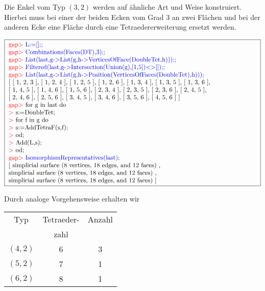 \documentclass[12pt,titlepage,twoside,cleardoublepage]{article}
\theoremstyle{nummermitklammern}
\numberwithin{equation}{section}
\begin{document}
 Die Enkel vom Typ $(3,2)$ werden auf ähnliche Art und Weise konstruiert. Hierbei muss bei einer der beiden Ecken vom Grad 3 an zwei Flächen und bei der anderen Ecke eine Fläche durch eine Tetraedererweiterung ersetzt werden.
 \begin{center}
 $\fbox{
\parbox{14cm}{
\textcolor{red}{gap$>$} \textcolor{blue}{L:=[];;}\newline
\textcolor{red}{gap$>$} \textcolor{blue}{Combinations(Faces(DT),3);;}\newline
\textcolor{red}{gap$>$} \textcolor{blue}{List(last,g-$>$List(g,h-$>$VerticesOfFace(DoubleTet,h)));;}\newline
\textcolor{red}{gap$>$} \textcolor{blue}{Filtered(last,g-$>$Intersection(Union(g),[1,5])<>[]);;}\newline
\textcolor{red}{gap$>$} \textcolor{blue}{List(last,g-$>$List(g,h->Position(VerticesOfFaces(DoubleTet),h)));}\newline
[ [ 1, 2, 3 ], [ 1, 2, 4 ], [ 1, 2, 5 ], [ 1, 2, 6 ], [ 1, 3, 4 ],
  [ 1, 3, 5 ], [ 1, 3, 6 ], \newline
  [ 1, 4, 5 ], [ 1, 4, 6 ], [ 1, 5, 6 ],
  [ 2, 3, 4 ], [ 2, 3, 5 ], [ 2, 3, 6 ], [ 2, 4, 5 ], 
 \newline
  [ 2, 4, 6 ], [ 2, 5, 6 ], [ 3, 4, 5 ], [ 3, 4, 6 ], [ 3, 5, 6 ], [ 4, 5, 6 ] ]\newline
\textcolor{red}{gap$>$} for g in last do\newline
\textcolor{red}{$>$} s:=DoubleTet;\newline
\textcolor{red}{$>$} for f in g do\newline
\textcolor{red}{$>$} s:=AddTetraF(s,f);\newline
\textcolor{red}{$>$} od;\newline
\textcolor{red}{$>$} Add(L,s);\newline
\textcolor{red}{$>$} od;\newline
\textcolor{red}{gap$>$} \textcolor{blue}{IsomorphismRepresentatives(last);}\newline
[ simplicial surface (8 vertices, 18 edges, and 12 faces)
    ,\newline
     simplicial surface (8 vertices, 18 edges, and 12 faces)
    ,\newline
  simplicial surface (8 vertices, 18 edges, and 12 faces)
 ]
}}$ 
\end{center}  
Durch analoge Vorgehensweise erhalten wir
\begin{center}
\begin{tabular}{|c|c|c|}
\hline
 Typ&Tetraeder-  & Anzahl\\
&zahl &\\
\hline
$(4,2)$&6& 3\\
\hline
$(5,2)$&7& 1\\
\hline
$(6,2)$&8& 1\\
\hline
\end{tabular}
\end{center}
\end{document}
